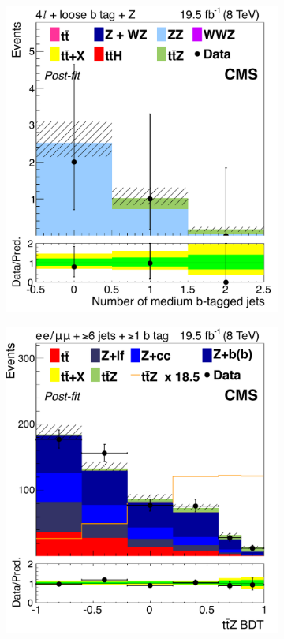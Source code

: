 \begin{figure}[tb]
\begin{subfigure}{0.33\textwidth}
    \caption{}
    \label{sfig:8-ttZ-tc}
  \end{subfigure}%
  \begin{subfigure}{0.33\textwidth}
    \includegraphics[width=\textwidth]{figures/eight-TeV/mva/4l_ge1j_Zpeak_mht30_1bloose_numMediumBJets}
    \caption{}
    \label{sfig:8-ttZ-tr}
  \end{subfigure}
  \begin{subfigure}{0.33\textwidth}
    \includegraphics[width=\textwidth]{figures/eight-TeV/mva/lep_lep_SF_ge6j_ge1t_FinalBDT}

\end{subfigure}
\end{figure}
